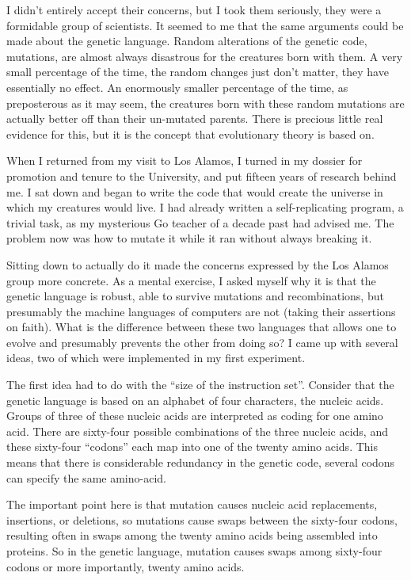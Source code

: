 I didn't entirely accept their concerns, but I took them seriously, they
were a formidable group of scientists.  It seemed
to me that the same arguments could be made about the genetic language.
Random alterations of the genetic code, mutations, are almost always
disastrous for the creatures born with them.  A very small percentage of the
time, the random changes just don't matter, they have essentially no effect.
An enormously smaller percentage of the time, as preposterous as it may
seem, the creatures born with these random mutations are actually better off
than their un-mutated parents.  There is precious little real evidence for
this, but it is the concept that evolutionary theory is based on.

When I returned from my visit to Los Alamos, I turned in my dossier for
promotion and tenure to the University, and put fifteen years of research
behind me.  I sat down and began to write the code that would create the
universe in which my creatures would live.  I had already written a
self-replicating program, a trivial task, as my mysterious Go teacher of
a decade past had advised me.  The problem now was how to mutate it while
it ran without always breaking it.

Sitting down to actually do it made the concerns expressed by the Los Alamos
group more concrete.  As a mental exercise, I asked myself why it is that
the genetic language is robust, able to survive mutations and recombinations,
but presumably the machine languages of computers are not (taking their
assertions on faith).  What is the difference between these two languages that
allows one to evolve and presumably prevents the other from doing so?  I came
up with several ideas, two of which were implemented in my first experiment.

The first idea had to do with the ``size of the instruction set''.  Consider
that the genetic language is based on an alphabet of four characters, the
nucleic acids.  Groups of three of these nucleic acids are interpreted as
coding for one amino acid.  There are sixty-four possible combinations of
the three nucleic acids, and these sixty-four ``codons'' each map into one
of the twenty amino acids.  This means that there is considerable redundancy
in the genetic code, several codons can specify the same amino-acid.

The important point here is that mutation causes nucleic
acid replacements, insertions, or deletions, so mutations cause swaps between
the sixty-four codons, resulting often in swaps among the twenty amino acids
being assembled into proteins.  So in the genetic language, mutation causes
swaps among sixty-four codons or more importantly, twenty amino acids.


